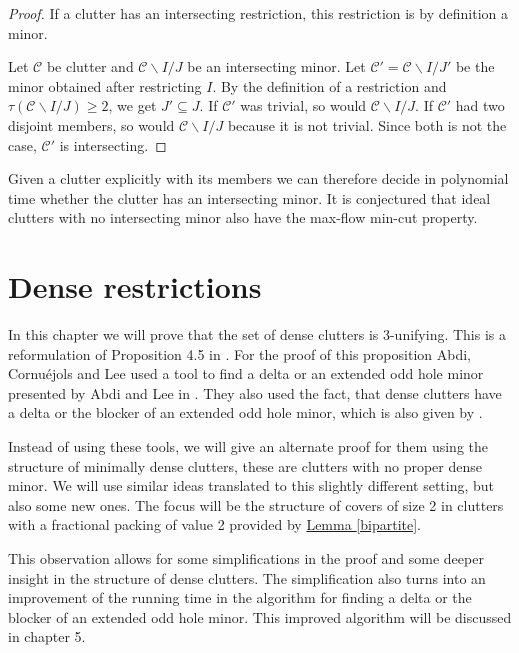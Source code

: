 \documentclass[a4paper, 12pt, twoside=false]{scrbook}
\theoremstyle{definition}
\begin{document}
  \begin{proof}
      If a clutter has an intersecting restriction, this restriction is by definition a minor.

      Let $\mathcal{C}$ be clutter and $\mathcal{C} \backslash I /J$ be an intersecting minor.
      Let $\mathcal{C'}=\mathcal{C} \backslash I /J'$ be the minor obtained after restricting $I$.
      By the definition of a restriction and $\tau(\mathcal{C} \backslash I /J) \geq 2$, we get $J' \subseteq J$. If $\mathcal{C'}$ was trivial, so would $\mathcal{C} \backslash I / J$.
      If $\mathcal{C'}$ had two disjoint members, so would $\mathcal{C} \backslash I /J$ because it is not trivial.
      Since both is not the case, $\mathcal{C'}$ is intersecting.
  \end{proof}

  Given a clutter explicitly with its members we can therefore decide in polynomial time whether the clutter has an intersecting minor. It is conjectured that ideal clutters with no intersecting minor also have the max-flow min-cut property\cite{restrictions}.


   \chapter{Dense restrictions}
   In this chapter we will prove that the set of dense clutters is 3-unifying.
   This is a reformulation of Proposition 4.5 in \cite{restrictions}.
   For the proof of this proposition Abdi, Cornuéjols and Lee used a tool to find a delta or an extended odd hole minor presented by Abdi and Lee in \cite{deltas}. They also used the fact, that dense clutters have a delta or the blocker of an extended odd hole minor, which is also given by \cite{deltas}.


   Instead of using these tools, we will give an alternate proof for them using the structure of minimally dense clutters, these are clutters with no proper dense minor.
   We will use similar ideas translated to this slightly different setting, but also some new ones.
   The focus will be the structure of covers of size 2 in clutters with a fractional packing of value 2 provided by \hyperref[bipartite]{Lemma \ref*{bipartite}}.

   This observation allows for some simplifications in the proof and some deeper insight in the structure of dense clutters.
   The simplification also turns into an improvement of the running time in the algorithm for finding a delta or the blocker of an extended odd hole minor. This improved algorithm will be discussed in chapter 5.
\end{document}
